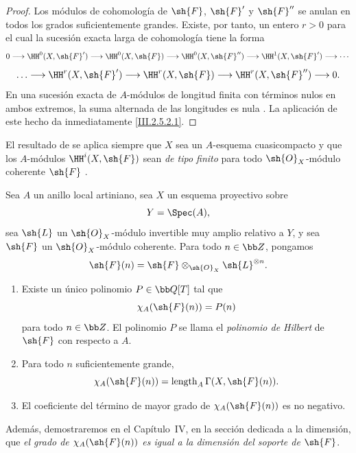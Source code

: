 \documentclass[oneside]{amsart}
\let\EGAOriginalLabel\label
\renewcommand{\label}[1]{\phantomsection\EGAOriginalLabel{#1}}
\begin{document}
\begin{proof}
Los módulos de cohomología de $\sh{F}$, $\sh{F}'$ y $\sh{F}''$ se anulan en todos los grados suficientemente grandes.
Existe, por tanto, un entero $r>0$ para el cual la sucesión exacta larga de cohomología tiene la forma
\[
  0\longrightarrow\HH^0(X,\sh{F}')
  \longrightarrow\HH^0(X,\sh{F})
  \longrightarrow\HH^0(X,\sh{F}'')
  \longrightarrow\HH^1(X,\sh{F}')
  \longrightarrow\cdots
\]
\[
  \ldots\longrightarrow\HH^r(X,\sh{F}')
  \longrightarrow\HH^r(X,\sh{F})
  \longrightarrow\HH^r(X,\sh{F}'')
  \longrightarrow0.
\]
En una sucesión exacta de $A$-módulos de longitud finita con términos nulos en ambos extremos, la suma alternada de las longitudes es nula .
La aplicación de este hecho da inmediatamente \eqref{III.2.5.2.1}.
\end{proof}

El resultado de  se aplica siempre que $X$ sea un $A$-esquema cuasicompacto y que los $A$-módulos $\HH^i(X,\sh{F})$ sean \emph{de tipo finito} para todo $\sh{O}_X$-módulo coherente $\sh{F}$ .

\begin{theorem}[2.5.3]
\label{III.2.5.3}
Sea $A$ un anillo local artiniano, sea $X$ un esquema proyectivo sobre
\[
  Y=\Spec(A),
\]
sea $\sh{L}$ un $\sh{O}_X$-módulo invertible muy amplio relativo a $Y$, y sea $\sh{F}$ un $\sh{O}_X$-módulo coherente.
Para todo $n\in\bb Z$, pongamos
\[
  \sh{F}(n)=\sh{F}\otimes_{\sh{O}_X}\sh{L}^{\otimes n}.
\]
\begin{enumerate}
  \item[\textup{(i)}] Existe un único polinomio $P\in\bb Q[T]$ tal que
  \[
    \chi_A(\sh{F}(n))=P(n)
  \]
  para todo $n\in\bb Z$.
  El polinomio $P$ se llama el \emph{polinomio de Hilbert} de $\sh{F}$ con respecto a $A$.

  \item[\textup{(ii)}] Para todo $n$ suficientemente grande,
  \[
    \chi_A(\sh{F}(n))
    =
    \operatorname{length}_A\Gamma(X,\sh{F}(n)).
  \]

  \item[\textup{(iii)}] El coeficiente del término de mayor grado de $\chi_A(\sh{F}(n))$ es no negativo.
\end{enumerate}
\end{theorem}

Además, demostraremos en el Capítulo~IV, en la sección dedicada a la dimensión, que \emph{el grado de $\chi_A(\sh{F}(n))$ es igual a la dimensión del soporte de $\sh{F}$}.
\end{document}
